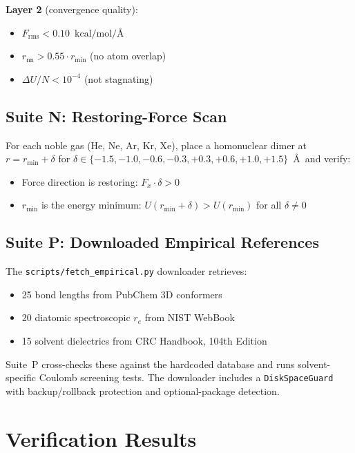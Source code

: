 \documentclass[11pt,twoside]{article}
\newcommand{\Angstrom}{\text{\AA}}
\newcommand{\kcalmol}{\text{kcal/mol}}
\newcommand{\Frms}{F_{\mathrm{rms}}}
\newcommand{\rmin}{r_{\mathrm{min}}}
\begin{document}
\textbf{Layer 2} (convergence quality):
\begin{itemize}
  \item $\Frms < 0.10$~$\kcalmol/\Angstrom$
  \item $r_{\mathrm{nn}} > 0.55 \cdot \rmin$ (no atom overlap)
  \item $\Delta U / N < 10^{-4}$ (not stagnating)
\end{itemize}

\subsection{Suite N: Restoring-Force Scan}

For each noble gas (He, Ne, Ar, Kr, Xe), place a homonuclear dimer at
$r = \rmin + \delta$ for $\delta \in \{-1.5, -1.0, -0.6, -0.3, +0.3,
+0.6, +1.0, +1.5\}$~\AA\ and verify:
\begin{itemize}
  \item Force direction is restoring: $F_x \cdot \delta > 0$
  \item $\rmin$ is the energy minimum: $U(\rmin + \delta) > U(\rmin)$ for
        all $\delta \neq 0$
\end{itemize}

\subsection{Suite P: Downloaded Empirical References}

The \texttt{scripts/fetch\_empirical.py} downloader retrieves:
\begin{itemize}
  \item 25 bond lengths from PubChem 3D conformers
  \item 20 diatomic spectroscopic $r_e$ from NIST WebBook
  \item 15 solvent dielectrics from CRC Handbook, 104th Edition
\end{itemize}

Suite~P cross-checks these against the hardcoded database and runs
solvent-specific Coulomb screening tests.  The downloader includes a
\texttt{DiskSpaceGuard} with backup/rollback protection and optional-package
detection.


\section{Verification Results}
\label{sec:results}
\end{document}
